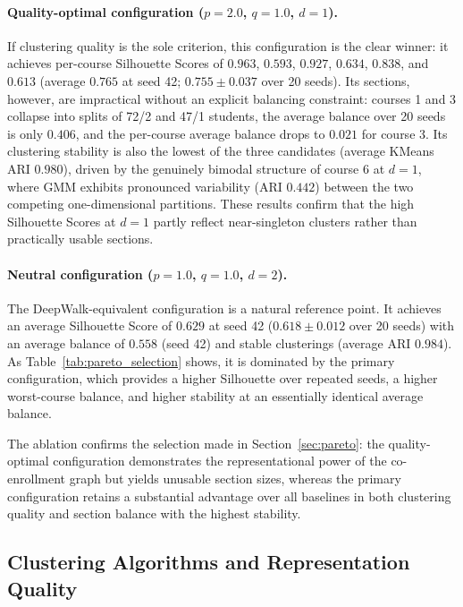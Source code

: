 \documentclass[pdflatex,sn-mathphys-num,iicol]{sn-jnl}%
\theoremstyle{thmstyleone}%
\theoremstyle{thmstyletwo}%
\theoremstyle{thmstylethree}%
\begin{document}
\paragraph{Quality-optimal configuration ($p=2.0$, $q=1.0$, $d=1$).}
If clustering quality is the sole criterion, this configuration is the clear winner: it achieves per-course Silhouette Scores of $0.963$, $0.593$, $0.927$, $0.634$, $0.838$, and $0.613$ (average $0.765$ at seed 42; $0.755 \pm 0.037$ over 20 seeds). Its sections, however, are impractical without an explicit balancing constraint: courses 1 and 3 collapse into splits of 72/2 and 47/1 students, the average balance over 20 seeds is only $0.406$, and the per-course average balance drops to $0.021$ for course 3. Its clustering stability is also the lowest of the three candidates (average KMeans ARI $0.980$), driven by the genuinely bimodal structure of course 6 at $d=1$, where GMM exhibits pronounced variability (ARI $0.442$) between the two competing one-dimensional partitions. These results confirm that the high Silhouette Scores at $d=1$ partly reflect near-singleton clusters rather than practically usable sections.

\paragraph{Neutral configuration ($p=1.0$, $q=1.0$, $d=2$).}
The DeepWalk-equivalent configuration is a natural reference point. It achieves an average Silhouette Score of $0.629$ at seed 42 ($0.618 \pm 0.012$ over 20 seeds) with an average balance of $0.558$ (seed 42) and stable clusterings (average ARI $0.984$). As Table~\ref{tab:pareto_selection} shows, it is dominated by the primary configuration, which provides a higher Silhouette over repeated seeds, a higher worst-course balance, and higher stability at an essentially identical average balance.

The ablation confirms the selection made in Section~\ref{sec:pareto}: the quality-optimal configuration demonstrates the representational power of the co-enrollment graph but yields unusable section sizes, whereas the primary configuration retains a substantial advantage over all baselines in both clustering quality and section balance with the highest stability.

\subsection{Clustering Algorithms and Representation Quality}
\end{document}
